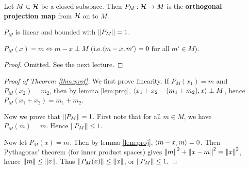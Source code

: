 \begin{defn}
	Let $M \subset \mathcal{H}$ be a closed subspace.
	Then $P_M: \mathcal{H} \to M$ is the \textbf{orthogonal projection map} from $\mathcal{H}$ on to $M$.
\end{defn}

\begin{thm}\label{thm:prof}
	$P_M$ is linear and bounded with $\left\lVert P_M \right\rVert=1$.
\end{thm}

\begin{lem}\label{lem:proj}
	$P_M(x)=m \iff m-x \perp M$ (i.e.\@ ${\left\langle m-x,m' \right\rangle}=0$ for all $m' \in M$).
\end{lem}

\begin{proof}
	Omitted.
	See the next lecture.
\end{proof}

\begin{proof}[Proof of Theorem \ref{thm:prof}]
	We first prove linearity.
	If $P_M(x_1)=m$ and $P_M(x_2)=m_2$, then by lemma \ref{lem:proj}, ${\left\langle x_1+x_2-(m_1+m_2),x \right\rangle} \perp M$, hence $P_M(x_1+x_2)=m_1+m_2$.
	
	Now we prove that $\left\lVert P_M \right\rVert=1$.
	First note that for all $m \in M$, we have $P_M(m)=m$.
	Hence $\left\lVert P_M \right\rVert \leq 1$.
	
	Now let $P_M(x)=m$.
	Then by lemma \ref{lem:proj}, ${\left\langle m-x,m \right\rangle}=0$.
	Then Pythagoras' theorem (for inner product spaces) gives $\left\lVert m \right\rVert^2 + \left\lVert x-m \right\rVert^2 = \left\lVert x \right\rVert^2$, hence $\left\lVert m \right\rVert \leq \left\lVert x \right\rVert$.
	Thus $\left\lVert P_M(x) \right\rVert \leq \left\lVert x \right\rVert$, or $\left\lVert P_M \right\rVert \leq 1$.
\end{proof}